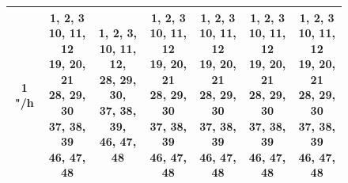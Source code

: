 \documentclass{article}
\begin{document}
\begin{figure}[H]
\begin{tabular}{|c|c|c|c|c|c|c|}
1 "/h & \makecell{1, 2, 3 \\ 10, 11, 12 \\ 19, 20, 21 \\ 28, 29, 30 \\ 37, 38, 39 \\ 46, 47, 48} & \makecell{1, 2, 3, \\ 10, 11, 12, \\ 28, 29, 30, \\ 37, 38, 39, \\ 46, 47, 48} & \makecell{1, 2, 3 \\ 10, 11, 12 \\ 19, 20, 21 \\ 28, 29, 30 \\ 37, 38, 39 \\ 46, 47, 48}  & \makecell{1, 2, 3 \\ 10, 11, 12 \\ 19, 20, 21 \\ 28, 29, 30 \\ 37, 38, 39 \\ 46, 47, 48}  & \makecell{1, 2, 3 \\ 10, 11, 12 \\ 19, 20, 21 \\ 28, 29, 30 \\ 37, 38, 39 \\ 46, 47, 48} & \makecell{1, 2, 3 \\ 10, 11, 12 \\ 19, 20, 21 \\ 28, 29, 30 \\ 37, 38, 39 \\ 46, 47, 48}\\
\hline

\end{tabular}
\end{figure}
\end{document}
